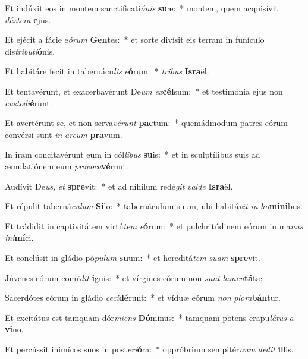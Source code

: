 \item Et indúxit eos in montem sanctificati\textit{ó}\textit{nis} \textbf{su}æ:~* montem, quem acquisívit \textit{déx}\textit{te}\textit{ra} \textbf{e}jus.
\item Et ejécit a fácie e\textit{ó}\textit{rum} \textbf{Gen}tes:~* et sorte divísit eis terram in funículo dis\textit{tri}\textit{bu}\textit{ti}\textbf{ó}nis.
\item Et habitáre fecit in tabernácu\textit{lis} \textit{e}\textbf{ó}rum:~* \textit{tri}\textit{bus} \textbf{Is}\textbf{ra}ël.
\item Et tentavérunt, et exacerbavérunt De\textit{um} \textit{ex}\textbf{cél}sum:~* et testimónia ejus non \textit{cus}\textit{to}\textit{di}\textbf{é}runt.
\item Et avertérunt se, et non serva\textit{vé}\textit{runt} \textbf{pac}tum:~* quemádmodum patres eórum convérsi sunt \textit{in} \textit{ar}\textit{cum} \textbf{pra}vum.
\item In iram concitavérunt eum in cól\textit{li}\textit{bus} \textbf{su}is:~* et in sculptílibus suis ad æmulatiónem eum \textit{pro}\textit{vo}\textit{ca}\textbf{vé}runt.
\item Audívit De\textit{us}, \textit{et} \textbf{spre}vit:~* et ad níhilum redé\textit{git} \textit{val}\textit{de} \textbf{Is}\textbf{ra}ël.
\item Et répulit taberná\textit{cu}\textit{lum} \textbf{Si}lo:~* tabernáculum suum, ubi habitá\textit{vit} \textit{in} \textit{ho}\textbf{mí}\textbf{ni}bus.
\item Et trádidit in captivitátem virtú\textit{tem} \textit{e}\textbf{ó}rum:~* et pulchritúdinem eórum in ma\textit{nus} \textit{in}\textit{i}\textbf{mí}ci.
\item Et conclúsit in gládio pó\textit{pu}\textit{lum} \textbf{su}um:~* et hereditá\textit{tem} \textit{su}\textit{am} \textbf{spre}vit.
\item Júvenes eórum com\textit{é}\textit{dit} \textbf{i}gnis:~* et vírgines eórum non \textit{sunt} \textit{la}\textit{men}\textbf{tá}tæ.
\item Sacerdótes eórum in gládio \textit{ce}\textit{ci}\textbf{dé}runt:~* et víduæ eórum \textit{non} \textit{plo}\textit{ra}\textbf{bán}tur.
\item Et excitátus est tamquam dór\textit{mi}\textit{ens} \textbf{Dó}minus:~* tamquam potens crapu\textit{lá}\textit{tus} \textit{a} \textbf{vi}no.
\item Et percússit inimícos suos in post\textit{e}\textit{ri}\textbf{ó}ra:~* oppróbrium sempitér\textit{num} \textit{de}\textit{dit} \textbf{il}lis.
